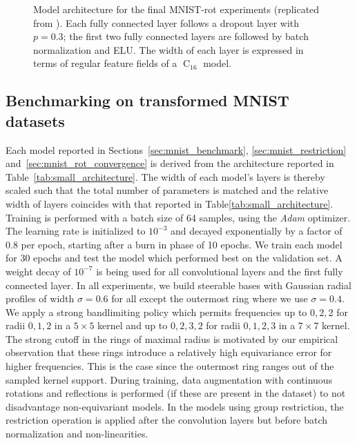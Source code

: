 \documentclass{article}
\newcommand{\C}[1]{\ensuremath{\operatorname{C}_{#1}}}
\begin{document}
\begin{figure}[H]
\begin{minipage}{\linewidth}
\begin{minipage}{0.45\linewidth}
\begin{table}[H]
{                }
                \vspace*{4pt}
                \caption{
                    Model architecture for the final MNIST-rot experiments (replicated from \cite{Weiler2018-STEERABLE}).
                    Each fully connected layer follows a dropout layer with $p=0.3$; the first two fully connected layers are followed by batch normalization and ELU.
                    The width of each layer is expressed in terms of regular feature fields of a $\C{16}$ model.
                }
                \vspace*{10pt}
                \label{tab:large_architecture}
            \end{table}  
        \end{minipage}
    \end{minipage}
    \vspace*{-12pt}
\end{figure}


\subsection{Benchmarking on transformed MNIST datasets}
\label{apx:mnist_benchmark_training}

Each model reported in Sections~\ref{sec:mnist_benchmark}, \ref{sec:mnist_restriction} and~\ref{sec:mnist_rot_convergence} is derived from the architecture reported in Table~\ref{tab:small_architecture}.
The width of each model's layers is thereby scaled such that the total number of parameters is matched and the relative width of layers coincides with that reported in Table\ref{tab:small_architecture}.
Training is performed with a batch size of 64 samples, using the \emph{Adam} optimizer.
The learning rate is initialized to $10^{-3}$ and decayed exponentially by a factor of $0.8$ per epoch, starting after a burn in phase of 10 epochs.
We train each model for 30 epochs and test the model which performed best on the validation set.
A weight decay of $10^{-7}$ is being used for all convolutional layers and the first fully connected layer.
In all experiments, we build steerable bases with Gaussian radial profiles of width $\sigma=0.6$ for all except the outermost ring where we use $\sigma = 0.4$.
We apply a strong bandlimiting policy which permits frequencies up to $0, 2, 2$ for radii $0, 1, 2$ in a $5\times5$ kernel and up to $0, 2, 3, 2$ for radii $0, 1, 2, 3$ in a $7\times7$ kernel.
The strong cutoff in the rings of maximal radius is motivated by our empirical observation that these rings introduce a relatively high equivariance error for higher frequencies.
This is the case since the outermost ring ranges out of the sampled kernel support.
During training, data augmentation with continuous rotations and reflections is performed (if these are present in the dataset) to not disadvantage non-equivariant models.
In the models using group restriction, the restriction operation is applied after the convolution layers but before batch normalization and non-linearities.
\end{document}
